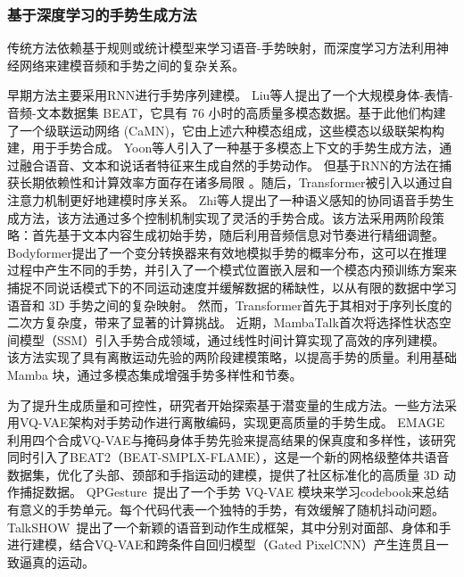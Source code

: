 \subsubsection{基于深度学习的手势生成方法}
传统方法依赖基于规则或统计模型来学习语音-手势映射，而深度学习方法利用神经网络来建模音频和手势之间的复杂关系\cite{nyatsanga2023comprehensive}。

早期方法主要采用RNN\cite{liu2022beat,yoon2020speech}进行手势序列建模。
Liu等人\cite{liu2022beat}提出了一个大规模身体-表情-音频-文本数据集 BEAT，它具有 76 小时的高质量多模态数据。基于此他们构建了一个级联运动网络 (CaMN)，它由上述六种模态组成，这些模态以级联架构构建，用于手势合成。
Yoon等人\cite{yoon2020speech}引入了一种基于多模态上下文的手势生成方法，通过融合语音、文本和说话者特征来生成自然的手势动作。
但基于RNN的方法在捕获长期依赖性和计算效率方面存在诸多局限
。随后，Transformer\cite{zhi2023livelyspeaker, pang2023bodyformer}被引入以通过自注意力机制更好地建模时序关系。
Zhi等人\cite{zhi2023livelyspeaker}提出了一种语义感知的协同语音手势生成方法，该方法通过多个控制机制实现了灵活的手势合成。该方法采用两阶段策略：首先基于文本内容生成初始手势，随后利用音频信息对节奏进行精细调整。
Bodyformer\cite{pang2023bodyformer}提出了一个变分转换器来有效地模拟手势的概率分布，这可以在推理过程中产生不同的手势，并引入了一个模式位置嵌入层和一个模态内预训练方案来捕捉不同说话模式下的不同运动速度并缓解数据的稀缺性，以从有限的数据中学习语音和 3D 手势之间的复杂映射。
然而，Transformer首先于其相对于序列长度的二次方复杂度，带来了显著的计算挑战。
近期，MambaTalk\cite{xu2025mambatalk}首次将选择性状态空间模型（SSM）引入手势合成领域，通过线性时间计算实现了高效的序列建模。该方法实现了具有离散运动先验的两阶段建模策略，以提高手势的质量。利用基础 Mamba 块，通过多模态集成增强手势多样性和节奏。

为了提升生成质量和可控性，研究者开始探索基于潜变量的生成方法。一些方法采用VQ-VAE架构对手势动作进行离散编码，实现更高质量的手势生成。
EMAGE~\cite{liu2024emage} 利用四个合成VQ-VAE与掩码身体手势先验来提高结果的保真度和多样性，该研究同时引入了BEAT2（BEAT-SMPLX-FLAME），这是一个新的网格级整体共语音数据集，优化了头部、颈部和手指运动的建模，提供了社区标准化的高质量 3D 动作捕捉数据。
QPGesture~\cite{yang2023qpgesture}提出了一个手势 VQ-VAE 模块来学习codebook来总结有意义的手势单元。每个代码代表一个独特的手势，有效缓解了随机抖动问题。
TalkSHOW~\cite{yi2023generating}提出了一个新颖的语音到动作生成框架，其中分别对面部、身体和手进行建模，结合VQ-VAE和跨条件自回归模型（Gated PixelCNN）产生连贯且一致逼真的运动。

